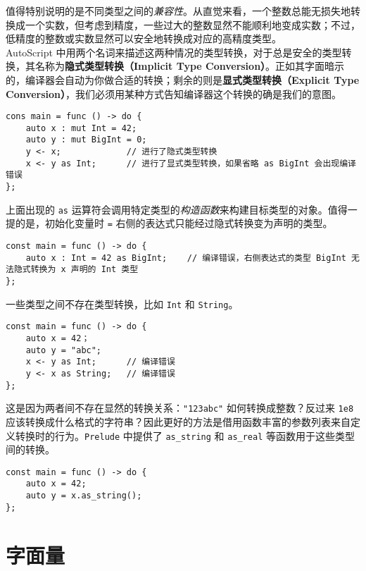 值得特别说明的是不同类型之间的\emph{兼容性}。从直觉来看，一个整数总能无损失地转换成一个实数，但考虑到精度，一些过大的整数显然不能顺利地变成实数；不过，低精度的整数或实数显然可以安全地转换成对应的高精度类型。 \\

AutoScript 中用两个名词来描述这两种情况的类型转换，对于总是安全的类型转换，其名称为\textbf{隐式类型转换（Implicit Type Conversion）}。正如其字面暗示的，编译器会自动为你做合适的转换；剩余的则是\textbf{显式类型转换（Explicit Type Conversion）}，我们必须用某种方式告知编译器这个转换的确是我们的意图。

\begin{lstlisting}
cons main = func () -> do {
    auto x : mut Int = 42;
    auto y : mut BigInt = 0;
    y <- x;             // 进行了隐式类型转换
    x <- y as Int;      // 进行了显式类型转换，如果省略 as BigInt 会出现编译错误
};
\end{lstlisting}

上面出现的 \lstinline!as! 运算符会调用特定类型的\emph{构造函数}来构建目标类型的对象。值得一提的是，初始化变量时 \lstinline!=! 右侧的表达式只能经过隐式转换变为声明的类型。

\begin{lstlisting}
const main = func () -> do {
    auto x : Int = 42 as BigInt;    // 编译错误，右侧表达式的类型 BigInt 无法隐式转换为 x 声明的 Int 类型
};
\end{lstlisting}

一些类型之间不存在类型转换，比如 \lstinline!Int! 和 \lstinline!String!。

\begin{lstlisting}
const main = func () -> do {
    auto x = 42；
    auto y = "abc";
    x <- y as Int;      // 编译错误
    y <- x as String;   // 编译错误
};
\end{lstlisting}

这是因为两者间不存在显然的转换关系：\lstinline!"123abc"! 如何转换成整数？反过来 \lstinline!1e8! 应该转换成什么格式的字符串？因此更好的方法是借用函数丰富的参数列表来自定义转换时的行为。\lstinline!Prelude! 中提供了 \lstinline{as_string} 和 \lstinline{as_real} 等函数用于这些类型间的转换。

\begin{lstlisting}
const main = func () -> do {
	auto x = 42;
	auto y = x.as_string();
};
\end{lstlisting}

\section{字面量}

